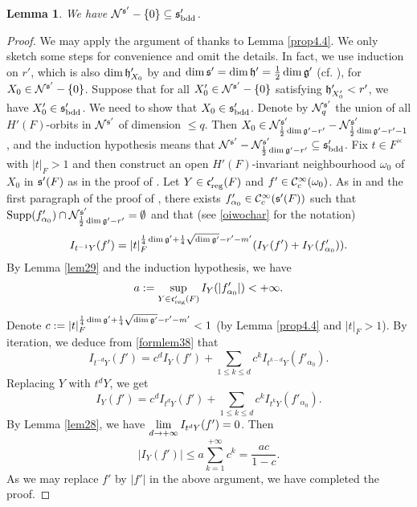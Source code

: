 \documentclass[a4paper]{amsart}
\newtheorem{lem}[thm]{Lemma}
\theoremstyle{definition}
\theoremstyle{remark}
\numberwithin{equation}{subsection}
\begin{document}
\begin{lem}\label{lem38}
We have ${\mathcal {N}}^{{\mathfrak{s}}'}-\{0\}\subseteq {\mathfrak{s}}'_{\mathrm{bdd}}$. 
\end{lem}

\begin{proof}
We may apply the argument of \cite[Lemma 6.16]{MR3414387} thanks to Lemma \ref{prop4.4}. We only sketch some steps for convenience and omit the details. In fact, we use induction on $r'$, which is also $\dim{\mathfrak{h}}'_{X_0}$ by \cite[Lemma 3.2]{MR3414387} and $\dim{\mathfrak{s}}'=\dim{\mathfrak{h}}'=\frac{1}{2}\dim{\mathfrak{g}}'$ (cf. \cite[Lemma 4.3]{MR3414387}), for $X_0\in{\mathcal {N}}^{{\mathfrak{s}}'}-\{0\}$. Suppose that for all $X'_0\in{\mathcal {N}}^{{\mathfrak{s}}'}-\{0\}$ satisfying ${\mathfrak{h}}'_{X'_0}<r'$, we have  $X'_0\in{\mathfrak{s}}'_{\mathrm{bdd}}$. We need to show that $X_0\in{\mathfrak{s}}'_{\mathrm{bdd}}$. Denote by ${\mathcal {N}}^{{\mathfrak{s}}'}_q$ the union of all $H'(F)$-orbits in ${\mathcal {N}}^{{\mathfrak{s}}'}$ of dimension $\leq q$. Then $X_0\in{\mathcal {N}}^{{\mathfrak{s}}'}_{\frac{1}{2}\dim{\mathfrak{g}}'-r'}-{\mathcal {N}}^{{\mathfrak{s}}'}_{\frac{1}{2}\dim{\mathfrak{g}}'-r'-1}$, and the induction hypothesis means that ${\mathcal {N}}^{{\mathfrak{s}}'}-{\mathcal {N}}^{{\mathfrak{s}}'}_{\frac{1}{2}\dim{\mathfrak{g}}'-r'}\subseteq{\mathfrak{s}}'_{\mathrm{bdd}}$. Fix $t\in F^\times$ with $|t|_F>1$ and then construct an open $H'(F)$-invariant neighbourhood $\omega_0$ of $X_0$ in ${\mathfrak{s}}'(F)$ as in the proof of \cite[Lemma 6.16]{MR3414387}. Let $Y\in{\mathfrak{c}}'_{\mathrm{reg}}(F)$ and $f'\in{\mathcal {C}}_c^\infty(\omega_0)$. As in \cite[(1) in p. 1853]{MR3414387} and the first paragraph of the proof of \cite[Lemma 6.16]{MR3414387}, there exists $f'_{\alpha_0}\in{\mathcal {C}}_c^\infty({\mathfrak{s}}'(F))$ such that ${\mathrm{Supp}}(f'_{\alpha_0})\cap{\mathcal {N}}^{{\mathfrak{s}}'}_{\frac{1}{2}\dim{\mathfrak{g}}'-r'}=\emptyset$ and that (see \eqref{oiwochar} for the notation)
\begin{equation}\label{formlem38}
 I_{t^{-1}Y}(f')=|t|_F^{\frac{1}{4}\dim{\mathfrak{g}}'+\frac{1}{4}\sqrt{\dim{\mathfrak{g}}'}-r'-m'}(I_Y(f')+I_Y(f'_{\alpha_0})). 
\end{equation}
By Lemma \ref{lem29} and the induction hypothesis, we have 
$$ a:=\sup_{Y\in{\mathfrak{c}}'_{\mathrm{reg}}(F)} I_Y(|f'_{\alpha_0}|)<+\infty. $$
Denote $c:=|t|_F^{\frac{1}{4}\dim{\mathfrak{g}}'+\frac{1}{4}\sqrt{\dim{\mathfrak{g}}'}-r'-m'}<1$ (by Lemma \ref{prop4.4} and $|t|_F>1$). By iteration, we deduce from \eqref{formlem38} that 
$$ I_{t^{-d}Y}(f')=c^dI_Y(f')+\sum_{1\leq k\leq d}c^k I_{t^{k-d}Y}(f'_{\alpha_0}). $$
Replacing $Y$ with $t^d Y$, we get 
$$ I_{Y}(f')=c^d I_{t^d Y}(f')+\sum_{1\leq k\leq d}c^k I_{t^k Y}(f'_{\alpha_0}). $$
By Lemma \ref{lem28}, we have $\lim\limits_{d\rightarrow+\infty} I_{t^d Y}(f')=0$. Then 
$$ |I_{Y}(f')|\leq a\sum_{k=1}^{+\infty} c^k=\frac{ac}{1-c}. $$
As we may replace $f'$ by $|f'|$ in the above argument, we have completed the proof. 
\end{proof}
\end{document}
